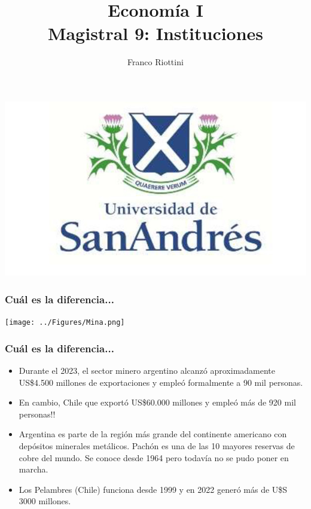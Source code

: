 \documentclass{beamer}
\title[Economía I]{Economía I \vspace{4mm}
\\ Magistral 9: Instituciones}
\date{}
\author[Riottini]{Franco Riottini}
\institute[]{Universidad de San Andrés}
\begin{document}
\begin{frame}
\titlepage
\centering
\includegraphics[scale=0.2]{../Figures/logoUDESA.jpg} 
\end{frame}


\begin{frame}
\frametitle{Cuál es la diferencia...}
\centering
\texttt{[image: ../Figures/Mina.png]}
\end{frame}

\begin{frame}
\frametitle{Cuál es la diferencia...}
\begin{itemize}
    \item Durante el 2023, el sector minero argentino alcanzó aproximadamente US\$4.500 millones de exportaciones y empleó formalmente a 90 mil personas.
    \item En cambio, Chile que exportó US\$60.000 millones y empleó más de 920 mil personas!!
    \item Argentina es parte de la región más grande del continente americano con depósitos minerales metálicos. Pachón es una de las 10 mayores reservas de cobre del mundo. Se conoce desde 1964 pero todavía no se pudo poner en marcha.
    \item Los Pelambres (Chile) funciona desde 1999 y en 2022 generó más de U\$S 3000 millones.
\end{itemize}
\end{frame}
\end{document}
